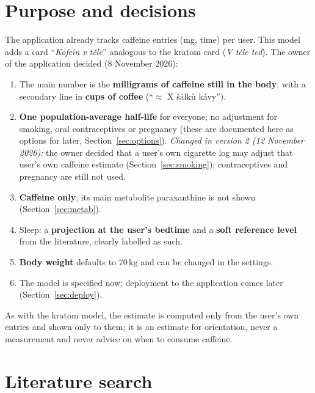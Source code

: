 \documentclass[10pt,a4paper]{article}
\begin{document}
\tableofcontents

\section{Purpose and decisions}
\label{sec:purpose}
The application already tracks caffeine entries (mg, time) per user. This model adds a card ``\emph{Kofein v těle}''
analogous to the kratom card (\emph{V těle teď}). The owner of the application decided (8 November 2026):

\begin{enumerate}
\item The main number is the \textbf{milligrams of caffeine still in the body}, with a secondary line in
\textbf{cups of coffee} (``$\approx$ X šálků kávy'').
\item \textbf{One population-average half-life} for everyone; no adjustment for smoking, oral
contraceptives or pregnancy (these are documented here as options for later, Section~\ref{sec:options}).
\emph{Changed in version 2 (12 November 2026):} the owner decided that a user's own cigarette log may adjust
that user's own caffeine estimate (Section~\ref{sec:smoking}); contraceptives and pregnancy are still not used.
\item \textbf{Caffeine only}; its main metabolite paraxanthine is not shown (Section~\ref{sec:metab}).
\item Sleep: a \textbf{projection at the user's bedtime} and a \textbf{soft reference level} from the
literature, clearly labelled as such.
\item \textbf{Body weight} defaults to 70\,kg and can be changed in the settings.
\item The model is specified now; deployment to the application comes later (Section~\ref{sec:deploy}).
\end{enumerate}
As with the kratom model, the estimate is computed only from the user's own entries and shown only to
them; it is an estimate for orientation, never a measurement and never advice on when to consume caffeine.

\section{Literature search}
\label{sec:search}
\end{document}
